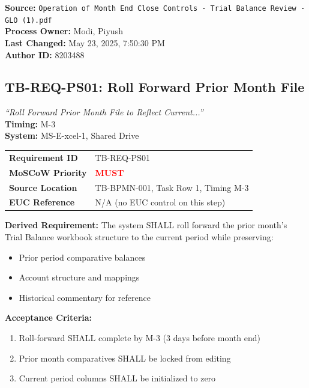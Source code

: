 \textbf{Source:} \texttt{Operation of Month End Close Controls - Trial Balance Review - GLO (1).pdf}\\
\textbf{Process Owner:} Modi, Piyush\\
\textbf{Last Changed:} May 23, 2025, 7:50:30 PM\\
\textbf{Author ID:} 8203488

\subsection{TB-REQ-PS01: Roll Forward Prior Month File}
\label{req:tb-req-ps01}

\begin{tcolorbox}[colback=sourcegreen!5,colframe=sourcegreen!70,title=BPMN Task Extract]
\textit{``Roll Forward Prior Month File to Reflect Current...''}\\
\textbf{Timing:} M-3\\
\textbf{System:} MS-E-xcel-1, Shared Drive
\end{tcolorbox}

\begin{tabularx}{\textwidth}{@{}lX@{}}
\toprule
\textbf{Requirement ID} & TB-REQ-PS01 \\
\textbf{MoSCoW Priority} & \textcolor{red}{\textbf{MUST}} \\
\textbf{Source Location} & TB-BPMN-001, Task Row 1, Timing M-3 \\
\textbf{EUC Reference} & N/A (no EUC control on this step) \\
\bottomrule
\end{tabularx}

\textbf{Derived Requirement:} The system SHALL roll forward the prior month's 
Trial Balance workbook structure to the current period while preserving:
\begin{itemize}
    \item Prior period comparative balances
    \item Account structure and mappings
    \item Historical commentary for reference
\end{itemize}

\textbf{Acceptance Criteria:}
\begin{enumerate}[label=AC-PS01-\arabic*:]
    \item Roll-forward SHALL complete by M-3 (3 days before month end)
    \item Prior month comparatives SHALL be locked from editing
    \item Current period columns SHALL be initialized to zero
\end{enumerate}

